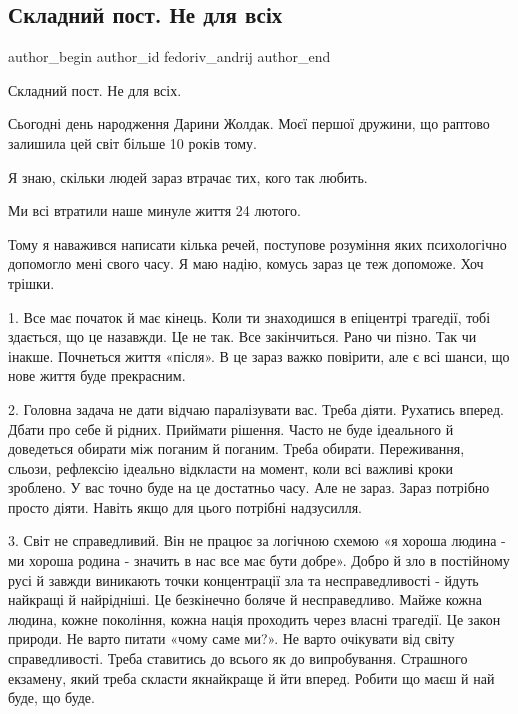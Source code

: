  
 
 
 
 
 
\subsection{Складний пост. Не для всіх}
\label{sec:24_12_2022.fb.fedoriv_andrij.1.skladnyj_post_ne_dlja_vsih}
 
\ifcmt
 author_begin
   author_id fedoriv_andrij
 author_end
\fi

Складний пост. Не для всіх. 

Сьогодні день народження Дарини Жолдак. Моєї першої дружини, що раптово залишила цей світ більше 10 років тому. 

Я знаю, скільки людей зараз втрачає тих, кого так любить. 

Ми всі втратили наше минуле життя 24 лютого. 

Тому я наважився написати  кілька речей, поступове розуміння яких психологічно
допомогло мені свого часу.  Я маю надію, комусь зараз це теж допоможе. Хоч
трішки.

1. Все має початок й має кінець. Коли ти знаходишся в епіцентрі трагедії, тобі
здається, що це назавжди. Це не так. Все закінчиться. Рано чи пізно. Так чи
інакше. Почнеться життя «після». В це зараз важко повірити, але є всі шанси, що
нове життя буде прекрасним. 

2. Головна задача не дати відчаю паралізувати вас. Треба діяти. Рухатись
вперед. Дбати про себе й рідних. Приймати рішення. Часто не буде ідеального й
доведеться обирати між поганим й поганим. Треба обирати. Переживання, сльози,
рефлексію ідеально  відкласти на момент, коли всі важливі кроки зроблено. У вас
точно буде на це достатньо часу. Але не зараз. Зараз потрібно просто діяти.
Навіть якщо для цього потрібні надзусилля. 

3. Світ не справедливий. Він не працює за логічною схемою «я хороша людина - ми
хороша родина - значить в нас все має бути добре». Добро й зло в постійному
русі й завжди виникають точки концентрації зла та несправедливості - йдуть
найкращі й найрідніші. Це безкінечно боляче й несправедливо. Майже кожна
людина, кожне покоління, кожна нація проходить через власні трагедії. Це закон
природи. Не варто питати «чому саме ми?». Не варто очікувати від світу
справедливості. Треба ставитись до всього як до випробування. Страшного
екзамену,  який треба скласти якнайкраще й йти вперед. Робити що маєш й най
буде, що буде. 

